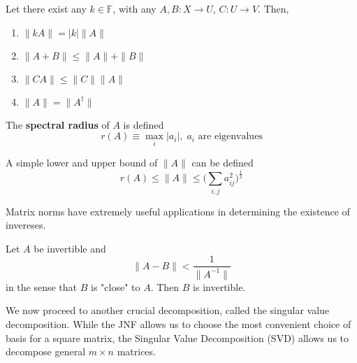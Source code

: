   \begin{theorem}
    Let there exist any $k \in \mathbb{F}$, with any $A, B: X \longrightarrow U$, $C: U \longrightarrow V$. Then, 
    \begin{enumerate}
      \item $\|k A\| = |k| \|A\|$
      \item $\|A + B\| \leq \|A\| + \|B\|$
      \item $\|C A\| \leq \|C\| \|A\|$
      \item $\|A\| = \|A^\dagger\|$
    \end{enumerate}
  \end{theorem}

  \begin{definition}
    The \textbf{spectral radius} of $A$ is defined
    \begin{equation}
      r(A) \equiv \max_i |a_i|, \; a_i \text{ are eigenvalues}
    \end{equation}
  \end{definition}

  \begin{proposition}
    A simple lower and upper bound of $\|A\|$ can be defined
    \begin{equation}
      r(A) \leq \|A\| \leq \bigg( \sum_{i, j} a_{i j}^2 \bigg)^\frac{1}{2}
    \end{equation}
  \end{proposition}

  Matrix norms have extremely useful applications in determining the existence of invereses. 

  \begin{theorem}
    Let $A$ be invertible and 
    \begin{equation}
      \|A - B\| < \frac{1}{\|A^{-1}\|}
    \end{equation}
    in the sense that $B$ is "close" to $A$. Then $B$ is invertible. 
  \end{theorem}

  We now proceed to another crucial decomposition, called the singular value decomposition. While the JNF allows us to choose the most convenient choice of basis for a square matrix, the Singular Value Decomposition (SVD) allows us to decompose general $m \times n$ matrices. 

